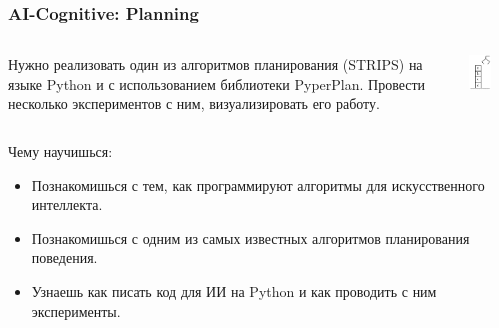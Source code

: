 \documentclass[default]{beamer}
\begin{document}
	\begin{frame}
		\frametitle{AI-Cognitive: Planning}
		
		\begin{columns}
			\begin{column}{0.65\textwidth}
				Нужно реализовать один из алгоритмов планирования (STRIPS) на языке Python и с использованием библиотеки PyperPlan. Провести несколько экспериментов с ним, визуализировать его работу.
			\end{column}
			\begin{column}{0.35\textwidth}
				\centering
				\includegraphics[width=0.5\textwidth,page=1]{examples/plan/block_world}
			\end{column}
		\end{columns}
		\par\bigskip
		Чему научишься:
		\begin{itemize}
			\item Познакомишься с тем, как программируют алгоритмы для искусственного интеллекта.
			\item Познакомишься с одним из самых известных алгоритмов планирования поведения.
			\item Узнаешь как писать код для ИИ на Python и как проводить с ним эксперименты.
		\end{itemize}
	\end{frame}
\end{document}
